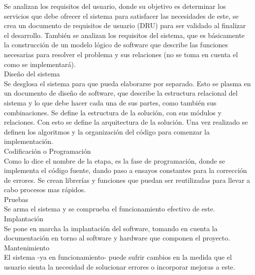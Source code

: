 \documentclass[twoside]{article}
\begin{document}
\begin{multicols}{2}
Se analizan los requisitos del usuario, donde su objetivo es determinar los servicios que debe ofrecer el sistema para satisfacer las necesidades de este, se crea un documento de requisitos de usuario (DRU) para ser validado al finalizar el desarrollo. Tambi\'en se analizan los requisitos del sistema, que es b\'asicamente la construcci\'on de un modelo l\'ogico de software que describe las funciones necesarias para resolver el problema y sus relaciones (no se toma en cuenta el como se implementar\'a).\\

Dise\~no del sistema\\

Se desglosa el sistema para que pueda elaborarse por separado. Esto se plasma en un documento de dise\~no de software, que describe la estructura relacional del sistema y lo que debe hacer cada una de sus partes, como tambi\'en sus combinaciones. 
Se define la estructura de la soluci\'on, con sus m\'odulos y relaciones. Con esto se define la arquitectura de la soluci\'on. Una vez realizado se definen los algoritmos y la organizaci\'on del c\'odigo para comenzar la implementaci\'on.\\

Codificaci\'on o Programaci\'on\\

Como lo dice el nombre de la etapa, es la fase de programaci\'on, donde se implementa el c\'odigo fuente, dando paso a ensayos constantes para la correcci\'on de errores. Se crean librer\'ias y funciones que puedan ser reutilizadas para llevar a cabo procesos mas r\'apidos.\\

Pruebas\\

Se arma el sistema y se comprueba el funcionamiento efectivo de este.\\

Implantaci\'on\\

Se pone en marcha la implantaci\'on del software, tomando en cuenta la documentaci\'on en torno al software y hardware que componen el proyecto.\\

Mantenimiento\\

El sistema -ya en funcionamiento- puede sufrir cambios en la medida que el usuario sienta la necesidad de solucionar errores o incorporar mejoras a este.\\
 

\end{multicols}
\end{document}
